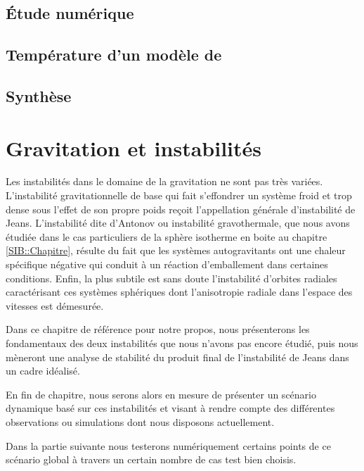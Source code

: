	\section{Étude numérique}
		


	\section{Température d'un modèle de \King \label{sec::temp}}
		

	\section{Synthèse}
		


\chapter{Gravitation et instabilités}
Les instabilités dans le domaine de la gravitation ne sont pas très variées. L'instabilité gravitationnelle de base qui fait s'effondrer un système froid et trop dense sous l'effet de son propre poids reçoit l'appellation générale d'instabilité de Jeans. L'instabilité dite d'Antonov ou instabilité gravothermale, que nous avons étudiée dans le cas particuliers de la sphère isotherme en boite au chapitre \ref{SIB::Chapitre}, résulte du fait que les systèmes autogravitants ont une chaleur spécifique négative qui conduit à un réaction d'emballement dans certaines conditions. Enfin, la plus subtile est sans doute l'instabilité d'orbites radiales caractérisant ces systèmes sphériques dont l'anisotropie radiale dans l'espace des vitesses est démesurée.

Dans ce chapitre de référence pour notre propos, nous présenterons les fondamentaux des deux instabilités que nous n'avons pas encore étudié, puis nous mèneront une analyse de stabilité du produit final de l'instabilité de Jeans dans un cadre idéalisé.

En fin de chapitre, nous serons alors en mesure de présenter un scénario dynamique basé sur ces instabilités et visant à rendre compte des différentes observations ou simulations dont nous disposons actuellement.

Dans la partie suivante nous testerons numériquement certains points de ce scénario global à travers un certain nombre de cas test bien choisis.
 
 



